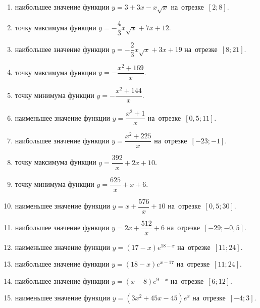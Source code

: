 \documentclass[a4paper,10pt]{article}
\begin{document}
\begin{enumerate}
\item {} наибольшее значение функции $y=3+3x -x\sqrt{x}$ на~отрезке~$\left[2;8\right]$.

\item {} точку максимума функции $y=-\dfrac{4}{3}x\sqrt{x} +7x+12$.

\item {} наибольшее значение функции $y=-\dfrac{2}{3}x\sqrt{x} +3x+19$ на~отрезке~$\left[8;21\right]$.

\item {} точку максимума функции $y=-\dfrac{x^2 +169}{x}$.

\item {} точку минимума функции $y=-\dfrac{x^2 +144}{x}$.

\item {} наименьшее значение функции $y=\dfrac{x^2 +1}{x}$ на~отрезке~$\left[0,5;11\right]$.

\item {} наибольшее значение функции $y=\dfrac{x^2 +225}{x}$ на~отрезке~$\left[-23;-1\right]$.

\item {} точку максимума функции $y=\dfrac{392}{x} +2x+10$.

\item {} точку минимума функции $y=\dfrac{625}{x} +x+6$.

\item {} наименьшее значение функции $y=x+\dfrac{576}{x} +10$ на~отрезке~$\left[0,5;30\right]$.

\item {} наибольшее значение функции $y=2x+\dfrac{512}{x} +6$ на~отрезке~$\left[-29;-0,5\right]$.

\item {} наименьшее значение функции $y=\left(17-x\right)e^{18-x}$ на~отрезке~$\left[11;24\right]$.

\item {} наибольшее значение функции $y=\left(18-x\right)e^{x-17}$ на~отрезке~$\left[11;24\right]$.

\item {} наибольшее значение функции $y=\left(x-8\right)e^{9-x}$ на~отрезке~$\left[6;12\right]$.

\item {} наименьшее значение функции $y=\left(3x^2 +45x -45\right)e^{x }$ на~отрезке~$\left[-4;3\right]$.


\end{enumerate}
\end{document}
